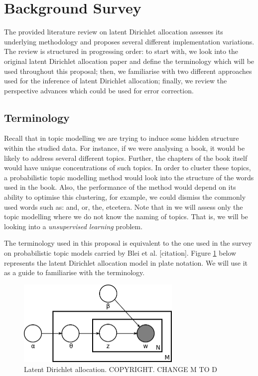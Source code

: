 \documentclass{mprop}
\begin{document}
\section{Background Survey}

\par The provided literature review on latent Dirichlet allocation assesses its underlying methodology and proposes several different implementation variations. The review is structured in progressing order: to start with, we look into the original latent Dirichlet allocation paper and define the terminology which will be used throughout this proposal; then, we familiarise with two different approaches used for the inference of latent Dirichlet allocation;  finally, we review the perspective advances which could be used for error correction.

\subsection{Terminology}

\par Recall that in topic modelling we are trying to induce some hidden structure within the studied data. For instance, if we were analysing a book, it would be likely to address several different topics. Further, the chapters of the book itself would have unique concentrations of such topics. In order to cluster these topics, a probabilistic topic modelling method would look into the structure of the words used in the book. Also, the performance of the method would depend on its ability to optimise this clustering, for example, we could dismiss the commonly used words such as: and, or, the, etcetera. Note that in we will assess only the topic modelling where we do not know the naming of topics. That is, we will be looking into a \textit{unsupervised learning} problem.

\par The terminology used in this proposal is equivalent to the one used in the survey on probabilistic topic models carried by Blei et al. [citation]. Figure \ref{fig:lda} below represents the latent Dirichlet allocation model in plate notation. We will use it as a guide to familiarise with the terminology.   
\begin{figure}[h]
  \centering
  \includegraphics[width=0.7\textwidth]{lda}
  \caption{Latent Dirichlet allocation. COPYRIGHT. CHANGE M TO D}
  \label{fig:lda}
\end{figure}
\end{document}
